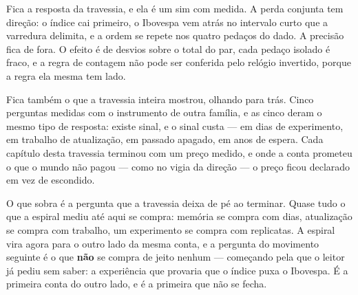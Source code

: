 Fica a resposta da travessia, e ela é um sim com medida. A perda conjunta tem direção: o índice cai
primeiro, o Ibovespa vem atrás no intervalo curto que a varredura delimita, e a ordem se repete nos
quatro pedaços do dado. A precisão fica de fora. O efeito é de \numConjuntaDesvios{} desvios sobre o total do
par, cada pedaço isolado é fraco, e a regra de contagem não pode ser conferida pelo relógio
invertido, porque a regra ela mesma tem lado.

Fica também o que a travessia inteira mostrou, olhando para trás. Cinco perguntas medidas com o
instrumento de outra família, e as cinco deram o mesmo tipo de resposta: existe sinal, e o sinal
custa --- em dias de experimento, em trabalho de atualização, em passado apagado, em anos de espera.
Cada capítulo desta travessia terminou com um preço medido, e onde a conta prometeu o que o mundo
não pagou --- como no vigia da direção --- o preço ficou declarado em vez de escondido.

O que sobra é a pergunta que a travessia deixa de pé ao terminar. Quase tudo o que a espiral mediu
até aqui se compra: memória se compra com dias, atualização se compra com trabalho, um experimento
se compra com replicatas. A espiral vira agora para o outro lado da mesma conta, e a pergunta do
movimento seguinte é o que \textbf{não} se compra de jeito nenhum --- começando pela que o leitor
já pediu sem saber: a experiência que provaria que o índice puxa o Ibovespa. É a primeira conta
do outro lado, e é a primeira que não se fecha.

